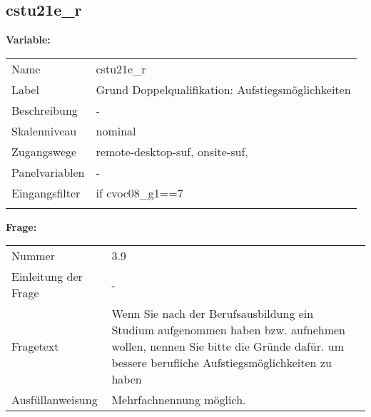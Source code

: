 	
	
	\subsection{cstu21e\_r}
	\label{subSection:cstu21e_r}

	\noindent\textbf{Variable:}\\
		\begin{tabular}{lL{11.3cm}}
			\label{tableVariable:cstu21e_r}
			Name & cstu21e\_r \\
			Label & Grund Doppelqualifikation: Aufstiegsmöglichkeiten \\
			Beschreibung & - \\
			Skalenniveau & nominal \\
			Zugangswege &
				remote-desktop-suf,
				onsite-suf,
 \\
			Panelvariablen & -
			 \\
			Eingangsfilter & if cvoc08\_g1==7 \\
 \\
		\end{tabular}

		\vspace*{1 cm}
		\noindent\textbf{Frage:}\\
		\begin{tabular}{lL{11.3cm}}
			\label{tableQuestion:cstu21e_r}
			Nummer & 3.9 \\
			Einleitung der Frage & - \\
			Fragetext & Wenn Sie nach der Berufsausbildung ein Studium aufgenommen haben bzw. aufnehmen wollen, nennen Sie bitte die Gründe dafür. 
um bessere berufliche Aufstiegsmöglichkeiten zu haben \\
			Ausfüllanweisung & Mehrfachnennung möglich. \\
		\end{tabular}





